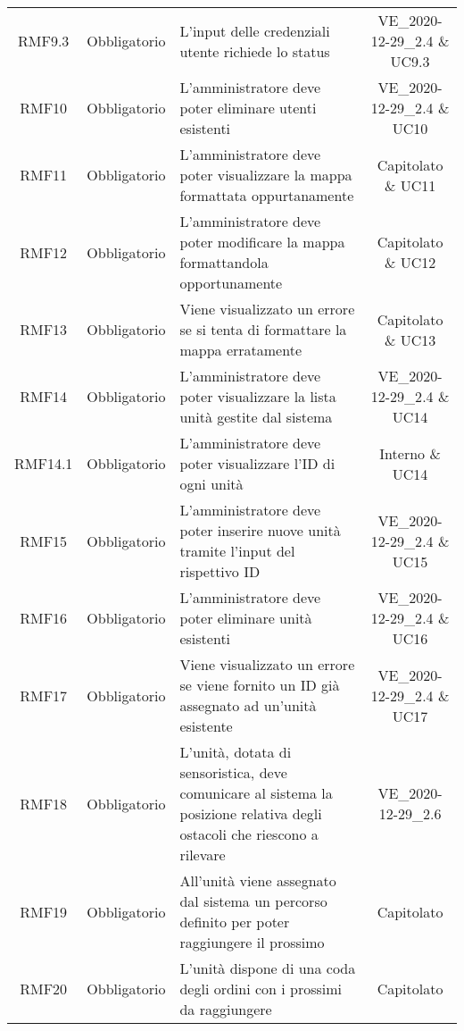 \begin{longtable}[h!] { c c m{8cm} c}
		RMF9.3 & Obbligatorio & L'input delle credenziali utente richiede lo status & VE\_2020-12-29\_2.4 \& UC9.3 \\

		RMF10 & Obbligatorio & L'amministratore deve poter eliminare utenti esistenti & VE\_2020-12-29\_2.4 \& UC10 \\

		RMF11 & Obbligatorio & L'amministratore deve poter visualizzare la mappa formattata oppurtanamente & Capitolato \& UC11 \\

		RMF12 & Obbligatorio & L'amministratore deve poter modificare la mappa formattandola opportunamente & Capitolato \& UC12 \\

		RMF13 & Obbligatorio & Viene visualizzato un errore se si tenta di formattare la mappa erratamente & Capitolato \& UC13 \\

		RMF14 & Obbligatorio & L'amministratore deve poter visualizzare la lista unità gestite dal sistema & VE\_2020-12-29\_2.4 \& UC14 \\

		RMF14.1 & Obbligatorio & L'amministratore deve poter visualizzare l'ID di ogni unità & Interno \& UC14 \\

		RMF15 & Obbligatorio & L'amministratore deve poter inserire nuove unità tramite l'input del rispettivo ID & VE\_2020-12-29\_2.4 \& UC15 \\

		RMF16& Obbligatorio & L'amministratore deve poter eliminare unità esistenti & VE\_2020-12-29\_2.4 \& UC16 \\

		RMF17 & Obbligatorio & Viene visualizzato un errore se viene fornito un ID già assegnato ad un'unità esistente & VE\_2020-12-29\_2.4 \& UC17 \\

		RMF18 & Obbligatorio & L'unità, dotata di sensoristica, deve comunicare al sistema la posizione relativa degli ostacoli che riescono a rilevare & VE\_2020-12-29\_2.6 \\

		RMF19 & Obbligatorio & All'unità viene assegnato dal sistema un percorso definito per poter raggiungere il prossimo \glock{POI} & Capitolato \\

		RMF20 & Obbligatorio & L'unità dispone di una coda degli ordini con i prossimi \glock{POI} da raggiungere & Capitolato \\


\end{longtable}
